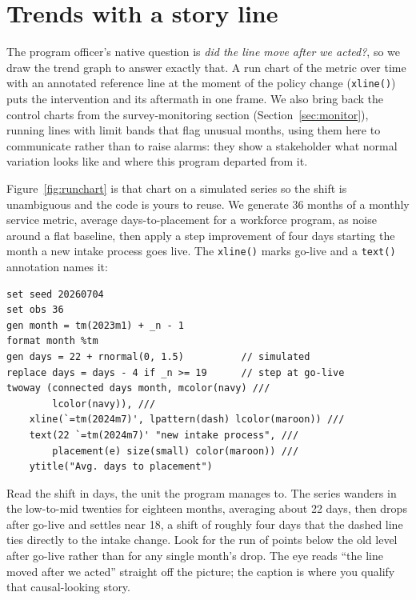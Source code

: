\documentclass[
    a4paper,
    fontsize=10pt,
    twoside=true,
    numbers=noenddot,
]{kaobook}
\begin{document}
\section{Trends with a story line}
The program officer's native question is \emph{did the line move after we acted?}, so we draw the trend graph to answer exactly that. A run chart of the metric over time with an annotated reference line at the moment of the policy change (\texttt{xline()}) puts the intervention and its aftermath in one frame. We also bring back the control charts from the survey-monitoring section (Section~\ref{sec:monitor}), running lines with limit bands that flag unusual months, using them here to communicate rather than to raise alarms: they show a stakeholder what normal variation looks like and where this program departed from it.

Figure~\ref{fig:runchart} is that chart on a simulated series so the shift is unambiguous and the code is yours to reuse. We generate 36 months of a monthly service metric, average days-to-placement for a workforce program, as noise around a flat baseline, then apply a step improvement of four days starting the month a new intake process goes live. The \texttt{xline()} marks go-live and a \texttt{text()} annotation names it:
\par
{\footnotesize
\begin{verbatim}
set seed 20260704
set obs 36
gen month = tm(2023m1) + _n - 1
format month %tm
gen days = 22 + rnormal(0, 1.5)          // simulated
replace days = days - 4 if _n >= 19      // step at go-live
twoway (connected days month, mcolor(navy) ///
        lcolor(navy)), ///
    xline(`=tm(2024m7)', lpattern(dash) lcolor(maroon)) ///
    text(22 `=tm(2024m7)' "new intake process", ///
        placement(e) size(small) color(maroon)) ///
    ytitle("Avg. days to placement")
\end{verbatim}
}
Read the shift in days, the unit the program manages to. The series wanders in the low-to-mid twenties for eighteen months, averaging about 22 days, then drops after go-live and settles near 18, a shift of roughly four days that the dashed line ties directly to the intake change. Look for the run of points below the old level after go-live rather than for any single month's drop. The eye reads \enquote{the line moved after we acted} straight off the picture; the caption is where you qualify that causal-looking story.
\end{document}
